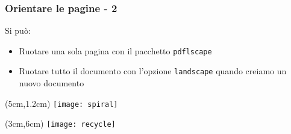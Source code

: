 \begin{frame}
 \frametitle{Orientare le pagine - 2}
 
 Si può:
 \begin{itemize}
  \item<1-> Ruotare una sola pagina con il pacchetto \texttt{pdflscape}
  \item<2-> Ruotare tutto il documento con l'opzione \texttt{landscape} quando 
creiamo un nuovo documento
 \end{itemize}

 
 \begin{textblock*}{5cm}(5cm,1.2cm)
   \texttt{[image: spiral]}
 \end{textblock*}
 
 \begin{textblock*}{5cm}(3cm,6cm)
   \texttt{[image: recycle]}
 \end{textblock*}
\end{frame}
